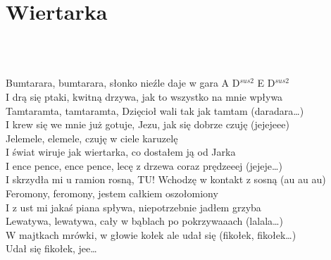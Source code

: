 \documentclass[a5paper, 10pt]{book}
\begin{document}
\section{Wiertarka}\textcolor{lightgray}{\textit{}}\\~\\
\begin{minipage}[t]{1\textwidth}
Bumtarara, bumtarara, słonko nieźle daje w gara \hfill A D$^{sus2}$ E D$^{sus2}$\\
I drą się ptaki, kwitną drzywa, jak to wszystko na mnie wpływa\\
Tamtaramta, tamtaramta, Dzięcioł wali tak jak tamtam (daradara…)\\
I krew się we mnie już gotuje, Jezu, jak się dobrze czuję (jejejeee)\\
Jelemele, elemele, czuję w ciele karuzelę\\
I świat wiruje jak wiertarka, co dostałem ją od Jarka\\
\hspace*{5mm}I ence pence, ence pence, lecę z drzewa coraz prędzeeej (jejeje…)\\
\hspace*{5mm}I skrzydła mi u ramion rosną, TU! Wchodzę w kontakt z sosną (au au au)\\
Feromony, feromony, jestem całkiem oszołomiony\\
I z ust mi jakaś piana spływa, niepotrzebnie jadłem grzyba\\
\hspace*{5mm}Lewatywa, lewatywa, cały w bąblach po pokrzywaaach (lalala…)\\
\hspace*{5mm}W majtkach mrówki, w głowie kołek ale udał się (fikołek, fikołek…)\\
\hspace*{5mm}Udał się fikołek, jee…\\
\end{minipage}
\begin{minipage}[t]{0\textwidth}
\end{minipage}

\newpage
\end{document}
